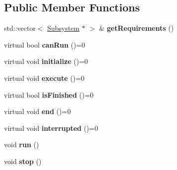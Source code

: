 \subsection*{Public Member Functions}
\begin{DoxyCompactItemize}
\item 
\mbox{\label{classlib_iterative_robot_1_1_command_a447ba6e394f165c6d358471a8bbdc76a}} 
std\+::vector$<$ \mbox{\hyperlink{classlib_iterative_robot_1_1_subsystem}{Subsystem}} $\ast$ $>$ \& {\bfseries get\+Requirements} ()
\item 
\mbox{\label{classlib_iterative_robot_1_1_command_aebef0fdf029a15ee48fbb778c4265609}} 
virtual bool {\bfseries can\+Run} ()=0
\item 
\mbox{\label{classlib_iterative_robot_1_1_command_a14543c9d38b07e52f9ffb2af88a63f60}} 
virtual void {\bfseries initialize} ()=0
\item 
\mbox{\label{classlib_iterative_robot_1_1_command_a4b38164af1a8645fae2fdae296317cf4}} 
virtual void {\bfseries execute} ()=0
\item 
\mbox{\label{classlib_iterative_robot_1_1_command_a8e4dccdd88f432a716090f532ba097f7}} 
virtual bool {\bfseries is\+Finished} ()=0
\item 
\mbox{\label{classlib_iterative_robot_1_1_command_ab30847f09859387b70bb7846f7ce7ca4}} 
virtual void {\bfseries end} ()=0
\item 
\mbox{\label{classlib_iterative_robot_1_1_command_a1c17b601d1b69822cabadb92069d1747}} 
virtual void {\bfseries interrupted} ()=0
\item 
\mbox{\label{classlib_iterative_robot_1_1_command_a3f3790d1b8033d7253a9f44481032ee9}} 
void {\bfseries run} ()
\item 
\mbox{\label{classlib_iterative_robot_1_1_command_ac91308101424f447f80665244b554171}} 
void {\bfseries stop} ()
\end{DoxyCompactItemize}
